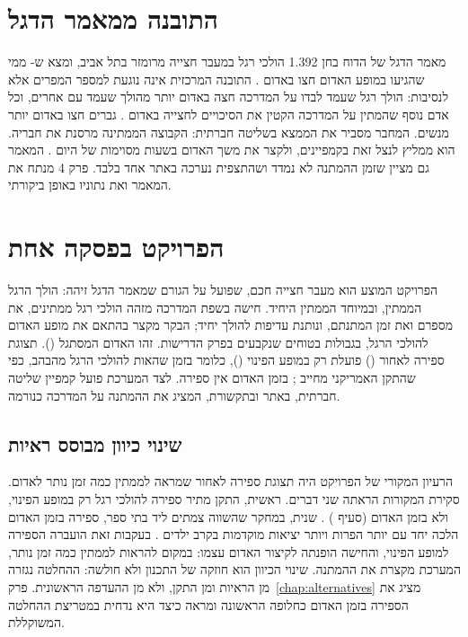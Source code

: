 \begin{statrow}[3]
\end{statrow}

\section{התובנה ממאמר הדגל}
מאמר הדגל של הדוח בחן \num{1,392} הולכי רגל במעבר חצייה מרומזר בתל אביב, ומצא ש- ממי שהגיעו במופע האדום חצו באדום \cite{rosenbloom2009}.
התובנה המרכזית אינה נוגעת למספר המפרים אלא לנסיבות: הולך רגל שעמד לבדו על המדרכה חצה באדום יותר מהולך שעמד עם אחרים, וכל אדם נוסף שהמתין על המדרכה הקטין את הסיכויים לחצייה באדום \cite{rosenbloom2009}.
גברים חצו באדום יותר מנשים.
המחבר מסביר את הממצא בשליטה חברתית: הקבוצה הממתינה מרסנת את חבריה. הוא ממליץ לנצל זאת בקמפיינים, ולקצר את משך האדום בשעות מסוימות של היום \cite{rosenbloom2009}.
המאמר גם מציין שזמן ההמתנה לא נמדד ושהתצפית נערכה באתר אחד בלבד. פרק \num{4} מנתח את המאמר ואת נתוניו באופן ביקורתי.

\section{הפרויקט בפסקה אחת}
הפרויקט המוצע הוא מעבר חצייה חכם, שפועל על הגורם שמאמר הדגל זיהה: הולך הרגל הממתין, ובמיוחד הממתין היחיד.
חישה בשפת המדרכה מזהה הולכי רגל ממתינים, את מספרם ואת זמן המתנתם, ונותנת עדיפות להולך יחיד; הבקר מקצר בהתאם את מופע האדום להולכי הרגל, בגבולות בטוחים שנקבעים בפרק הדרישות. זהו האדום המסתגל ().
תצוגת ספירה לאחור () פועלת רק במופע הפינוי (), כלומר בזמן שהאות להולכי הרגל מהבהב, כפי שהתקן האמריקני מחייב \cite{fhwa2025mutcd}; בזמן האדום אין ספירה.
לצד המערכת פועל קמפיין שליטה חברתית, באתר ובתקשורת, המציג את ההמתנה על המדרכה כנורמה.

\subsection{שינוי כיוון מבוסס ראיות}
הרעיון המקורי של הפרויקט היה תצוגת ספירה לאחור שמראה לממתין כמה זמן נותר לאדום.
סקירת המקורות הראתה שני דברים. ראשית, התקן מתיר ספירה להולכי רגל רק במופע הפינוי, ולא בזמן האדום (סעיף ) \cite{fhwa2025mutcd}. שנית, במחקר שהשווה צמתים ליד בתי ספר, ספירה בזמן האדום הלכה יחד עם יותר הפרות ויותר יציאות מוקדמות בקרב ילדים \cite{fu2016}.
בעקבות זאת הועברה הספירה למופע הפינוי, והחישה הופנתה לקיצור האדום עצמו: במקום להראות לממתין כמה זמן נותר, המערכת מקצרת את ההמתנה.
שינוי הכיוון הוא חוזקה של התכנון ולא חולשה: ההחלטה נגזרה מן הראיות ומן התקן, ולא מן ההעדפה הראשונית.
פרק~\ref{chap:alternatives} מציג את הספירה בזמן האדום כחלופה הראשונה ומראה כיצד היא נדחית במטריצת ההחלטה המשוקללת.

